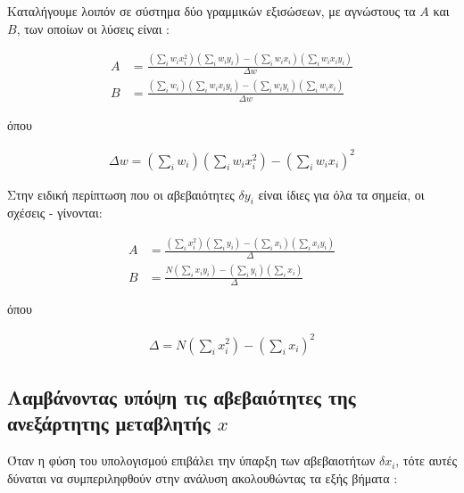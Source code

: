 \begin{refsection}
\noindent Καταλήγουμε λοιπόν σε σύστημα δύο γραμμικών εξισώσεων, με αγνώστους τα $A$ και $Β$, των οποίων οι λύσεις είναι \parencites{2008_Fornasini_BOOK_CHAPTER}{1997_Taylor_BOOK_CHAPTER}{2018_HughW.Coleman_BOOK_CHAPTER}{1991_Lyons_BOOK_CHAPTER}:

\begin{align}
A &= \frac{\left(\sum\nolimits_i w_i x_i ^2\right) \left(\sum\nolimits_i w_i y_i \right) - \left(\sum\nolimits_i w_i x_i\right) \left(\sum\nolimits_i w_i x_i y_i\right)}{\Delta w} \label{eqn:Asol}\\
B &= \frac{\left(\sum\nolimits_i w_i\right) \left(\sum\nolimits_i w_i x_i y_i \right) - \left(\sum\nolimits_i w_i y_i\right) \left(\sum\nolimits_i w_i x_i\right)}{\Delta w} \label{eqn:Bsol}
\end{align}

\noindent όπου 

\begin{align}
\Delta w = \left(\sum\nolimits_i w_i\right)\left(\sum\nolimits_i w_i x_i^2\right) - \left(\sum\nolimits_i w_i x_i\right)^2
\end{align}

\noindent Στην ειδική περίπτωση που οι αβεβαιότητες $\delta y_i$ είναι ίδιες για όλα τα σημεία, οι σχέσεις  -  γίνονται:

\begin{align}
A &= \frac{\left(\sum\nolimits_i x_i ^2\right) \left(\sum\nolimits_i y_i \right) - \left(\sum\nolimits_i x_i\right) \left(\sum\nolimits_i x_i y_i\right)}{\Delta} \label{eqn:A'sol}\\
B &= \frac{N\left(\sum\nolimits_i x_i y_i\right) - \left(\sum\nolimits_i y_i\right) \left(\sum\nolimits_i x_i\right)}{\Delta} \label{eqn:B'sol}
\end{align}

\noindent όπου 

\begin{align}
\Delta = N\left(\sum\nolimits_i x_i^2\right) - \left(\sum\nolimits_i x_i\right) ^2
\end{align}

\subsection*{Λαμβάνοντας υπόψη τις αβεβαιότητες της ανεξάρτητης μεταβλητής $x$}

\noindent Όταν η φύση του υπολογισμού επιβάλει την ύπαρξη των αβεβαιοτήτων  $\delta x_i$, τότε αυτές δύναται να συμπεριληφθούν στην ανάλυση ακολουθώντας τα εξής βήματα \parencites{2008_Fornasini_BOOK_CHAPTER}{1997_Taylor_BOOK_CHAPTER}:


\end{refsection}
